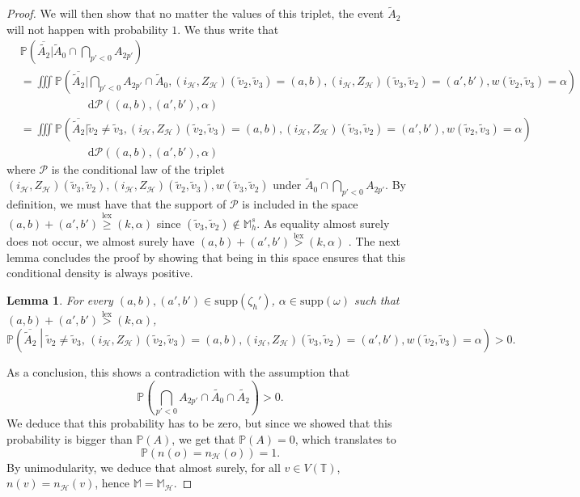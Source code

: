 \documentclass[10pt,a4paper]{amsart}
\newtheorem{lemma}{Lemma}
\DeclareMathOperator{\lex}{lex}
\begin{document}
\begin{proof}
We will then show that no matter the values of this triplet, the event $\tilde A_{2}$ will not happen with probability $1$. We thus write that
\begin{align*}
    &\mathbb{P}\left(\overline{\tilde{A_{2}}} \bigg| \tilde A_0 \cap \bigcap_{p' < 0} A_{2p'}\right) \\
    &=\iiint \mathbb{P}\left(\overline{\tilde{A}_{2}} \bigg| \bigcap_{p' <0} A_{2p'}\cap \tilde{A}_0, (i_\mathcal{H},Z_{\mathcal{H}})(\tilde{v}_{2},\tilde{v}_{3})=(a,b), (i_\mathcal{H},Z_{\mathcal{H}})(\tilde{v}_{3},\tilde{v}_{2})=(a',b'), w(\tilde{v}_{2},\tilde{v}_{3})=\alpha  \right)\\
    &\qquad \qquad \qquad \mathrm{d}\mathcal{P}((a,b),(a',b'),\alpha) \\
    &=\iiint \mathbb{P}\left(\overline{\tilde{A}_{2}} \bigg| \tilde{v}_2 \neq \tilde{v}_3, (i_\mathcal{H},Z_{\mathcal{H}})(\tilde{v}_{2},\tilde{v}_{3})=(a,b), (i_\mathcal{H},Z_{\mathcal{H}})(\tilde{v}_{3},\tilde{v}_{2})=(a',b'), w(\tilde{v}_{2},\tilde{v}_{3})=\alpha  \right)\\
    &\qquad \qquad \qquad \mathrm{d}\mathcal{P}((a,b),(a',b'),\alpha )
\end{align*}
where $\mathcal{P}$ is the conditional law of the triplet $(i_{\mathcal{H}},Z_{\mathcal{H}})(\tilde{v}_{3},\tilde{v}_{2}),(i_{\mathcal{H}},Z_{\mathcal{H}})(\tilde{v}_{2},\tilde{v}_{3}) ,w(\tilde{v}_{3},\tilde{v}_{2})$ under $\tilde{A}_0\cap\bigcap_{p' < 0} A_{2p'}$. By definition, we must have that the support of $\mathcal{P}$ is included in the space $(a,b)+(a',b') \overset{\lex}{\geq }(k,\alpha)$ since $(\tilde{v}_{3},\tilde{v}_{2}) \notin \mathbb{M}_h^s$. As equality almost surely does not occur, we almost surely have $(a,b)+(a',b') \overset{\lex}{> }(k,\alpha)$ . The next lemma concludes the proof by showing that being in this space ensures that this conditional density is always positive.
\begin{lemma}\label{lem:Mhstop}
    For every $(a,b),(a',b') \in \mathrm{supp}(\zeta_{h}')$, $ \alpha \in \mathrm{supp} (\omega)$ such that $(a,b)+(a',b')\overset{\lex}{>}(k,\alpha)$, \[ \mathbb{P} \left( \overline{\tilde A_{2}} \middle| \tilde{v}_2 \neq \tilde{v}_3 , \,(i_\mathcal{H},Z_{\mathcal{H}})(\tilde{v}_{2},\tilde{v}_{3})=(a,b), (i_\mathcal{H},Z_{\mathcal{H}})(\tilde{v}_{3},\tilde{v}_{2})=(a',b'), w(\tilde{v}_{2},\tilde{v}_{3})=\alpha \right)    >0   . \]
\end{lemma}
As a conclusion, this shows a contradiction with the assumption that  \[  \mathbb{P}\left(  \bigcap_{p'<0}A_{2p'} \cap \tilde{A_0}\cap \tilde{A_2} \right)>0.\]
We deduce that this probability has to be zero, but since we showed that this probability is bigger than $\mathbb{P}(A)$, we get that $\mathbb{P}(A)=0$, which translates to
\[ \mathbb{P}(n(o)=n_{\mathcal{H}}(o))=1.  \]
By unimodularity, we deduce that almost surely, for all $v \in V(\mathbb{T})$, $n(v)=n_{\mathcal{H}}(v)$, hence $\mathbb{M}=\mathbb{M}_{\mathcal{H}}$.

\end{proof}
\end{document}
